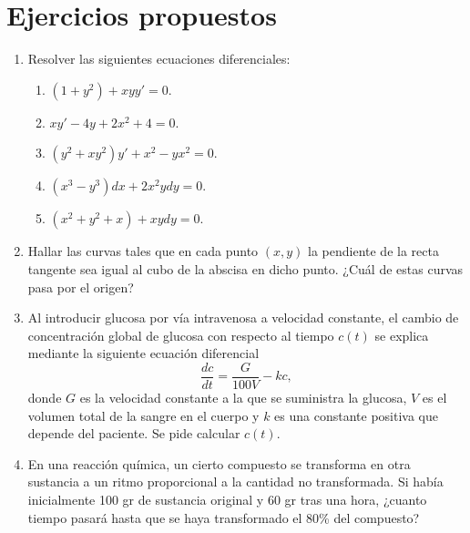 \section{Ejercicios propuestos}
\begin{enumerate}[leftmargin=*]

\item Resolver las siguientes ecuaciones diferenciales:
      \begin{enumerate}
      \item $(1+y^{2})+xyy'=0$.
      \item $xy'-4y+2x^2+4=0$.
      \item $(y^{2}+xy^{2})y'+x^{2}-yx^{2}=0$.
      \item $(x^3-y^3)dx+2x^2ydy=0$.
      \item $(x^2+y^2+x)+xydy=0$.
      \end{enumerate}

\item Hallar las curvas tales que en cada punto $(x,y)$ la pendiente de la recta tangente sea igual al cubo de la
      abscisa en dicho punto.
      ¿Cuál de estas curvas pasa por el origen?

\item Al introducir glucosa por vía intravenosa a velocidad constante, el cambio de concentración global de glucosa con
      respecto al tiempo $c(t)$ se explica mediante la siguiente ecuación diferencial
      \[
      \frac{dc}{dt}=\frac{G}{100V}-kc,
      \]
      donde $G$ es la velocidad constante a la que se suministra la glucosa, $V$ es el volumen total de la sangre en el cuerpo y $k$ es una constante positiva que depende del paciente. Se pide calcular $c(t)$.

\item En una reacción química, un cierto compuesto se transforma en otra sustancia a un ritmo proporcional a la cantidad
      no transformada.
      Si había inicialmente 100 gr de sustancia original y 60 gr tras una hora, ¿cuanto tiempo pasará hasta
      que se haya transformado el 80\% del compuesto?
\end{enumerate}

